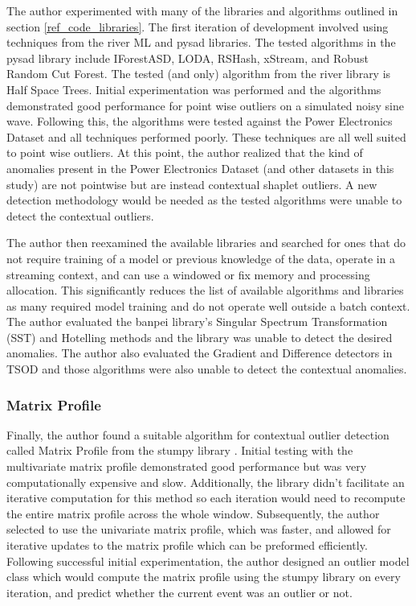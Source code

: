 The author experimented with many of the libraries and algorithms outlined in section \ref{ref_code_libraries}. The first iteration of development involved using techniques from the river ML \parencite{2020river} and pysad \parencite{pysad} libraries.  The tested algorithms in the pysad library include IForestASD, LODA, RSHash, xStream, and Robust Random Cut Forest. The tested (and only) algorithm from the river library is Half Space Trees. Initial experimentation was performed and the algorithms demonstrated good performance for point wise outliers on a simulated noisy sine wave. Following this, the algorithms were tested against the Power Electronics Dataset and all techniques performed poorly. These techniques are all well suited to point wise outliers. At this point, the author realized that the kind of anomalies present in the Power Electronics Dataset (and other datasets in this study) are not pointwise but are instead contextual shaplet outliers. A new detection methodology would be needed as the tested algorithms were unable to detect the contextual outliers.

The author then reexamined the available libraries and searched for ones that do not require training of a model or previous knowledge of the data, operate in a streaming context, and can use a windowed or fix memory and processing allocation. This significantly reduces the list of available algorithms and libraries as many required model training and do not operate well outside a batch context. The author evaluated the banpei \parencite{banpei} library's Singular Spectrum Transformation (SST) and Hotelling methods and the library was unable to detect the desired anomalies. The author also evaluated the Gradient and Difference detectors in TSOD \parencite{tsod} and those algorithms were also unable to detect the contextual anomalies.

\subsubsection{Matrix Profile}

Finally, the author found a suitable algorithm for contextual outlier detection called Matrix Profile from the stumpy library \parencite{law2019stumpy}. Initial testing with the multivariate matrix profile demonstrated good performance but was very computationally expensive and slow. Additionally, the library didn't facilitate an iterative computation for this method so each iteration would need to recompute the entire matrix profile across the whole window. Subsequently, the author selected to use the univariate matrix profile, which was faster, and allowed for iterative updates to the matrix profile which can be preformed efficiently. Following successful initial experimentation, the author designed an outlier model class which would compute the matrix profile using the stumpy library on every iteration, and predict whether the current event was an outlier or not. 

